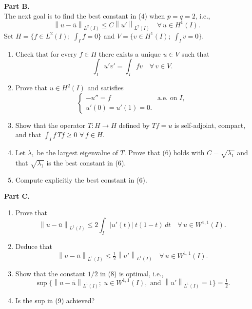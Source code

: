 \documentclass[12pt]{article}
\newcommand{\norm}[1]{\left\|#1\right\|}
\newcommand{\abs}[1]{\left|#1\right|}
\begin{document}
\noindent\textbf{Part B.}\\
The next goal is to find the best constant in (4) when $p = q = 2$, i.e.,
\begin{equation}\tag{6}
\norm{u - \bar{u}}_{L^2(I)} \le C\norm{u'}_{L^2(I)} \quad \forall\, u \in H^1(I).
\end{equation}
Set $H = \{f \in L^2(I);\; \int_I f = 0\}$ and $V = \{v \in H^1(I);\; \int_I v = 0\}$.
 
\begin{enumerate}
\item Check that for every $f \in H$ there exists a unique $u \in V$ such that
\[
\int_I u'v' = \int_I fv \quad \forall\, v \in V.
\]
 
\item Prove that $u \in H^2(I)$ and satisfies
\[
\begin{cases}
-u'' = f & \text{a.e. on } I,\\
u'(0) = u'(1) = 0.
\end{cases}
\]
 
\item Show that the operator $T : H \to H$ defined by $Tf = u$ is self-adjoint,
compact, and that $\int_I f\,Tf \ge 0$ $\forall\, f \in H$.
 
\item Let $\lambda_1$ be the largest eigenvalue of $T$. Prove that (6) holds with $C = \sqrt{\lambda_1}$
and that $\sqrt{\lambda_1}$ is the best constant in (6).
 
 
\item Compute explicitly the best constant in (6).
\end{enumerate}
 
\noindent\textbf{Part C.}
 
\begin{enumerate}
\item Prove that
\begin{equation}\tag{7}
\norm{u - \bar{u}}_{L^1(I)} \le 2\int_I \abs{u'(t)}\,t(1-t)\,dt \quad \forall\, u \in W^{1,1}(I).
\end{equation}
 
\item Deduce that
\begin{equation}\tag{8}
\norm{u - \bar{u}}_{L^1(I)} \le \tfrac{1}{2}\norm{u'}_{L^1(I)} \quad \forall\, u \in W^{1,1}(I).
\end{equation}
 
\item Show that the constant $1/2$ in (8) is optimal, i.e.,
\begin{equation}\tag{9}
\sup\{\norm{u - \bar{u}}_{L^1(I)};\; u \in W^{1,1}(I),\text{ and } \norm{u'}_{L^1(I)} = 1\} = \tfrac{1}{2}.
\end{equation}
 
\item Is the sup in (9) achieved?
\end{enumerate}
 
\end{document}
